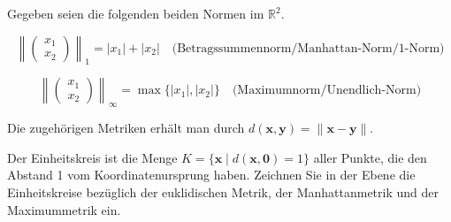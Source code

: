 Gegeben seien die folgenden beiden Normen im $\mathbb{R}^2$.

\[
\left\| \begin{pmatrix} x_1 \\ x_2 \end{pmatrix} \right\|_1 = |x_1| + |x_2| \quad \text{(Betragssummennorm/Manhattan-Norm/1-Norm)}
\]

\[
\left\| \begin{pmatrix} x_1 \\ x_2 \end{pmatrix} \right\|_\infty = \max\{|x_1|, |x_2|\} \quad \text{(Maximumnorm/Unendlich-Norm)}
\]

Die zugehörigen Metriken erhält man durch $d(\mathbf{x}, \mathbf{y}) = \|\mathbf{x} - \mathbf{y}\|$.

Der Einheitskreis ist die Menge $K = \{\mathbf{x} \mid d(\mathbf{x}, \mathbf{0}) = 1\}$ aller Punkte, die den Abstand 1 vom Koordinatenursprung haben. Zeichnen Sie in der Ebene die Einheitskreise bezüglich der euklidischen Metrik, der Manhattanmetrik und der Maximummetrik ein.
